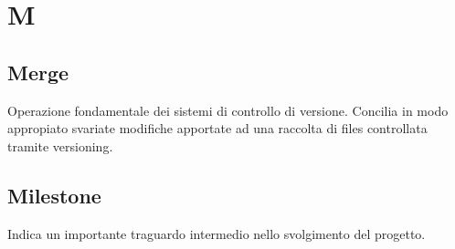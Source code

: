 \section*{M}

\subsection{Merge} 
Operazione fondamentale dei sistemi di controllo di versione. Concilia in modo appropiato svariate modifiche apportate ad una raccolta di files controllata tramite versioning.

\subsection{Milestone} 
Indica un importante traguardo intermedio nello svolgimento del progetto.
